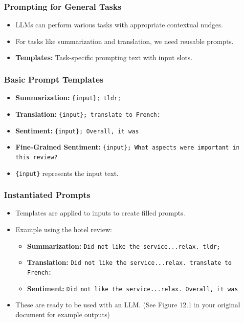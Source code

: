 \begin{frame}
    \frametitle{Prompting for General Tasks}
    \begin{itemize}
        \item LLMs can perform various tasks with appropriate contextual nudges.
        \item For tasks like summarization and translation, we need reusable prompts.
        \item \textbf{Templates:} Task-specific prompting text with input slots.
    \end{itemize}
\end{frame}

\begin{frame}
    \frametitle{Basic Prompt Templates}
    \begin{itemize}
        \item \textbf{Summarization:} \texttt{\{input\}; tldr;}
        \item \textbf{Translation:} \texttt{\{input\}; translate to French:}
        \item \textbf{Sentiment:} \texttt{\{input\}; Overall, it was}
        \item \textbf{Fine-Grained Sentiment:} \texttt{\{input\}; What aspects were important in this review?}
        \item \texttt{\{input\}} represents the input text.
    \end{itemize}
\end{frame}

\begin{frame}
    \frametitle{Instantiated Prompts}
    \begin{itemize}
        \item Templates are applied to inputs to create filled prompts.
        \item Example using the hotel review:
        \begin{itemize}
            \item \textbf{Summarization:} \texttt{Did not like the service...relax. tldr;}
            \item \textbf{Translation:} \texttt{Did not like the service...relax. translate to French:}
            \item \textbf{Sentiment:} \texttt{Did not like the service...relax. Overall, it was}
        \end{itemize}
        \item These are ready to be used with an LLM.  (See Figure 12.1 in your original document for example outputs)
    \end{itemize}
\end{frame}

